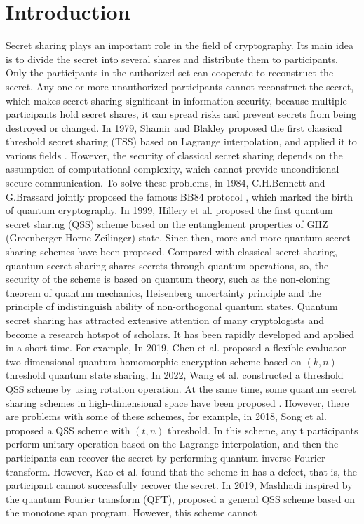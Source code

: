 \documentclass[pdflatex,sn-mathphys]{sn-jnl}%
\theoremstyle{thmstyleone}%
\theoremstyle{thmstyletwo}%
\theoremstyle{thmstylethree}%
\begin{document}
\section{Introduction}\label{sec1}

Secret sharing plays an important role in the field of cryptography. Its main idea is to divide the secret into several shares and distribute them to participants. Only the participants in the authorized set can cooperate to reconstruct the secret. Any one or more unauthorized participants cannot reconstruct the secret, which makes secret sharing significant in information security, because multiple participants hold secret shares, it can spread risks and prevent secrets from being destroyed or changed. In 1979, Shamir \cite{ref-ur1} and Blakley \cite{ref-ur2} proposed the first classical threshold secret sharing (TSS) based on Lagrange interpolation, and applied it to various fields \cite{ref-ur3,ref-ur4,ref-ur5,ref-ur6,ref-ur7,ref-ur8,ref-ur9}. However, the security of classical secret sharing depends on the assumption of computational complexity, which cannot provide unconditional secure communication. To solve these problems, in 1984, C.H.Bennett and G.Brassard jointly proposed the famous BB84 protocol \cite{ref-ur10}, which marked the birth of quantum cryptography. In 1999, Hillery et al.\cite{ref-ur11}  proposed the first quantum secret sharing (QSS) scheme based on the entanglement properties of GHZ (Greenberger Horne Zeilinger) state. Since then, more and more quantum secret sharing schemes \cite{ref-ur12,ref-ur13,ref-ur14,ref-ur15,ref-ur16,ref-ur17,ref-ur18,ref-ur19,ref-ur20,ref-ur21} have been proposed. Compared with classical secret sharing, quantum secret sharing shares secrets through quantum operations, so, the security of the scheme is based on quantum theory, such as the non-cloning theorem of quantum mechanics, Heisenberg uncertainty principle and the principle of indistinguish ability of non-orthogonal quantum states. Quantum secret sharing has attracted extensive attention of many cryptologists and become a research hotspot of scholars. It has been rapidly developed and applied in a short time. For example, In 2019, Chen et al.\cite{ref-ur12} proposed a flexible evaluator two-dimensional quantum homomorphic encryption scheme based on $(k,n)$ threshold quantum state sharing, In 2022, Wang et al.\cite{ref-ur14} constructed a threshold QSS scheme by using rotation operation. At the same time, some quantum secret sharing schemes in high-dimensional space have been proposed \cite{ref-ur15,ref-ur16,ref-ur17,ref-ur18,ref-ur19,ref-ur21}. However, there are problems with some of these schemes, for example, in 2018, Song et al. \cite{ref-ur13} proposed a QSS scheme with $(t,n)$ threshold. In this scheme, any t participants perform unitary operation based on the Lagrange interpolation, and then the participants can recover the secret by performing quantum inverse Fourier transform. However, Kao et al. \cite{ref-ur22} found that the scheme in \cite{ref-ur13} has a defect, that is, the participant cannot successfully recover the secret. In 2019, Mashhadi \cite{ref-ur19} inspired by the quantum Fourier transform (QFT), proposed a general QSS scheme based on the monotone span program. However, this scheme cannot 
\end{document}
